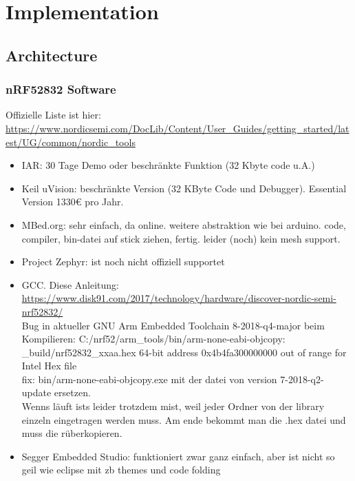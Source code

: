 \chapter{Implementation}
\label{ch:implementation}

\section{Architecture}

\subsection{nRF52832 Software}
Offizielle Liste ist hier:
\url{https://www.nordicsemi.com/DocLib/Content/User_Guides/getting_started/latest/UG/common/nordic_tools}
\begin{itemize}
\item IAR: 30 Tage Demo oder beschränkte Funktion (32 Kbyte code u.A.)
\item Keil uVision: beschränkte Version (32 KByte Code und Debugger). Essential Version 1330€ pro Jahr.
\item MBed.org: sehr einfach, da online. weitere abstraktion wie bei arduino. code, compiler, bin-datei auf stick ziehen, fertig. leider (noch) kein mesh support.
\item Project Zephyr: ist noch nicht offiziell supportet
\item GCC. Diese Anleitung: \url{https://www.disk91.com/2017/technology/hardware/discover-nordic-semi-nrf52832/}\\
Bug in aktueller GNU Arm Embedded Toolchain 8-2018-q4-major beim Kompilieren: C:/nrf52/arm\_tools/bin/arm-none-eabi-objcopy: \_build/nrf52832\_xxaa.hex 64-bit address 0x4b4fa300000000 out of range for Intel Hex file\\
fix: bin/arm-none-eabi-objcopy.exe mit der datei von version 7-2018-q2-update ersetzen.\\
Wenns läuft ists leider trotzdem mist, weil jeder Ordner von der library einzeln eingetragen werden muss. Am ende bekommt man die .hex datei und muss die rüberkopieren.
\item Segger Embedded Studio: funktioniert zwar ganz einfach, aber ist nicht so geil wie eclipse mit zb themes und code folding
\end{itemize}


